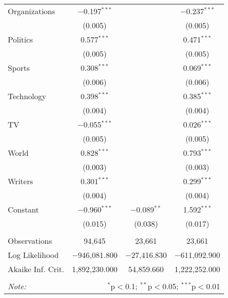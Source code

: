 \begin{table}[!htbp]
\begin{tabular}{@{\extracolsep{5pt}}lccc}
  Organizations & $-$0.197$^{***}$ &  & $-$0.237$^{***}$ \\ 
  & (0.005) &  & (0.005) \\ 
  Politics & 0.577$^{***}$ &  & 0.471$^{***}$ \\ 
  & (0.005) &  & (0.005) \\ 
  Sports & 0.308$^{***}$ &  & 0.069$^{***}$ \\ 
  & (0.006) &  & (0.006) \\ 
  Technology & 0.398$^{***}$ &  & 0.385$^{***}$ \\ 
  & (0.004) &  & (0.004) \\ 
  TV & $-$0.055$^{***}$ &  & 0.026$^{***}$ \\ 
  & (0.005) &  & (0.005) \\ 
  World & 0.828$^{***}$ &  & 0.793$^{***}$ \\ 
  & (0.003) &  & (0.003) \\ 
  Writers & 0.301$^{***}$ &  & 0.299$^{***}$ \\ 
  & (0.004) &  & (0.004) \\ 
  Constant & $-$0.960$^{***}$ & $-$0.089$^{**}$ & 1.592$^{***}$ \\ 
  & (0.015) & (0.038) & (0.017) \\ 
 \hline \\[-1.8ex] 
Observations & 94,645 & 23,661 & 23,661 \\ 
Log Likelihood & $-$946,081.800 & $-$27,416.830 & $-$611,092.900 \\ 
Akaike Inf. Crit. & 1,892,230.000 & 54,859.660 & 1,222,252.000 \\ 
\hline 
\hline \\[-1.8ex] 
\textit{Note:}  & \multicolumn{3}{r}{$^{*}$p$<$0.1; $^{**}$p$<$0.05; $^{***}$p$<$0.01} \\ 
\end{tabular} 
\end{table} 
